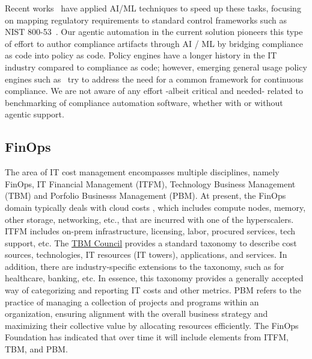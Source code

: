 Recent works~\cite{survey, change-iaai2022} have applied AI/ML techniques to speed up these tasks, focusing on mapping regulatory requirements to standard control frameworks such as NIST 800-53~\cite{nist800-53catalog}. Our agentic automation in the current \bench solution pioneers this type of effort to author compliance artifacts through AI / ML by bridging compliance as code into policy as code. Policy engines have a longer history in the IT industry compared to compliance as code; however, emerging general usage policy engines such as~\cite{Intro:OPA} try to address the need for a common framework for continuous compliance. 
We are not aware of any effort -albeit critical and needed- related to benchmarking of compliance automation software, whether with or without agentic support.

\subsection{FinOps}
The area of IT cost management encompasses multiple disciplines, namely FinOps, IT Financial Management (ITFM), Technology Business Management (TBM) and Porfolio Businesss Management (PBM). At present, the FinOps domain typically deals with cloud costs \cite{cloud_finops_2nd, OptITfinops}, which includes compute nodes, memory, other storage, networking, etc., that are incurred with one of the hyperscalers.  ITFM includes on-prem infrastructure, licensing, labor, procured services, tech support, etc. The \href{https://www.tbmcouncil.org/}{TBM Council} provides a standard taxonomy to describe cost sources, technologies, IT resources (IT towers), applications, and services. In addition, there are industry-specific extensions to the taxonomy, such as for healthcare, banking, etc. In essence, this taxonomy provides a generally accepted way of categorizing and reporting IT costs and other metrics. PBM refers to the practice of managing a collection of projects and programs within an organization, ensuring alignment with the overall business strategy and maximizing their collective value by allocating resources efficiently. The FinOps Foundation has indicated that over time it will include elements from ITFM, TBM, and PBM.


